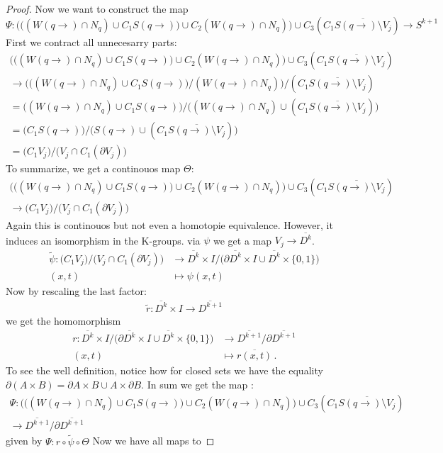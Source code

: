 \begin{proof}
Now we want to construct the map 
\begin{equation}
	\Psi: \Bigg( \Big( (W(q\to )\cap N_q)\cup C_1 S(q\to)\Big)\cup C_2 (W(q\to )\cap N_q)\Bigg)\cup  C_3 (C_1 \overline{S(q\to)\setminus V_j}) \to S^{k+1}
\end{equation}
First we contract all unnecesarry parts: 
\begin{align*}
	\Bigg( \Big( (W(q\to )\cap N_q)\cup C_1 S(q\to)\Big)\cup C_2 (W(q\to )\cap N_q)\Bigg)\cup  C_3 (C_1 \overline{S(q\to)\setminus V_j}) \\
	\to \Bigg( \Big( (W(q\to )\cap N_q)\cup C_1 S(q\to)\Big) \Big/ (W(q\to )\cap N_q)\Bigg) \Big/ (C_1 \overline{S(q\to)\setminus V_j}) \\
	=   \Big( (W(q\to )\cap N_q)\cup C_1 S(q\to)\Big)         \Big/     
	\Big( (W(q\to )\cap N_q) \cup (C_1 \overline{S(q\to)\setminus V_j}) \Big) \\
	= \Big( C_1 S(q\to)  \Big)  \big/   \big( S(q\to ) \cup (C_1 \overline{S(q\to)\setminus V_j}) \big)\\
	= \big( C_1 V_j \big)\big/ \big( V_j \cap C_1(\partial V_j)\big) 
\end{align*}
To summarize, we get a continouos map $\Theta$: 
\begin{align*}
	\Bigg( \Big( (W(q\to )\cap N_q)\cup C_1 S(q\to)\Big)\cup C_2 (W(q\to )\cap N_q)\Bigg)\cup  C_3 (C_1 \overline{S(q\to)\setminus V_j}) \\ 
	\to \big( C_1 V_j \big)\big/ \big( V_j \cap C_1(\partial V_j)\big) 
\end{align*}
Again this is continouos but not even a homotopie equivalence. However, it induces an isomorphism in the K-groups. 
via $\psi$ we get a map $V_j\to \overline{D^k}$. 
\begin{align*}
	\tilde{\psi}: \big( C_1 V_j \big)\big/ \big( V_j \cap C_1(\partial V_j)\big)  &\to \overline{D^k}\times I \big/ \big(\partial \overline{D^k}\times I\cup \overline{D^k}\times \{0,1\} \big)\\
	(x,t)					&\mapsto \psi(x,t)
\end{align*}
Now by rescaling the last factor:
\begin{align*}
	\tilde{r}: \overline{D^k}\times I \to \overline{D^{k+1}}
\end{align*} 
we get the homomorphism
\begin{align*}
	r:\overline{D^k}\times I \big/ \big(\partial \overline{D^k}\times I\cup \overline{D^k}\times \{0,1\} \big) 
				&\to \overline{D^{k+1}} \big/ \partial \overline{D^{k+1}}\\
	(x,t)		& \mapsto \overline{r(x,t)}\, .
\end{align*} To see the well definition, notice how for closed sets we have the equality $\partial(A\times B)=\partial A \times B \cup A\times \partial B$. 
In sum we get the map :
\begin{align*}
	\Psi: 	\Bigg( \Big( (W(q\to )\cap N_q)\cup C_1 S(q\to)\Big)\cup C_2 (W(q\to )\cap N_q)\Bigg)\cup  C_3 (C_1 \overline{S(q\to)\setminus V_j}) \\ 
	\to \overline{D^{k+1}} \big/ \partial \overline{D^{k+1}}
\end{align*} given by $\Psi: r \circ \tilde{\psi} \circ \Theta$
Now we have all maps to 
\end{proof}
	